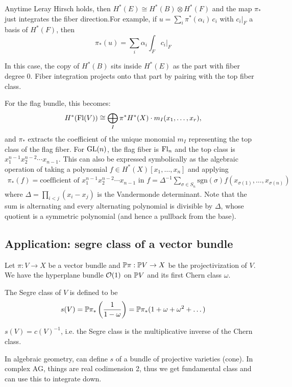 \documentclass[12pt]{article}
\begin{document}
\begin{remark}
    Anytime Leray Hirsch holds, then $H^*(E)\cong H^*(B)\otimes H^*(F)$ and the map $\pi_*$ just integrates the fiber direction.For example, if
$u=\sum_i \pi^*(\alpha_i)\,c_i$
with $c_i|_F$ a basis of $H^*(F)$, then
\[\pi_*(u)=\sum_i \alpha_i \int_F c_i|_F\]



In this case, the copy of $H^*(B)$ sits inside $H^*(E)$ as the part with fiber degree 0. Fiber integration projects onto that part by pairing with the top fiber class.

For the flag bundle, this becomes:
\[
H^*(\Fl(V))\cong \bigoplus_I \pi^*H^*(X)\cdot m_I(x_1,\dots,x_r),
\]
and $\pi_*$ extracts the coefficient of the unique monomial $m_I$ representing the top class of the flag fiber. For $\GL(n)$, the flag fiber is $\Fl_n$ and the top class is $x_1^{n-1}x_2^{n-2}\cdots x_{n-1}$. This can also be expressed symbolically as the algebraic operation of taking a polynomial $f \in H^*(X)[x_1,\dots,x_n]$ and applying \begin{align*}
    \pi_*(f) = \text{coefficient of } x_1^{n-1}x_2^{n-2}\cdots x_{n-1} \text{ in } f = \Delta^{-1} \sum_{\sigma \in S_n} \mathrm{sgn}(\sigma) f(x_{\sigma(1)},\dots, x_{\sigma(n)})
\end{align*}
where $\Delta = \prod_{i<j} (x_i - x_j)$ is the Vandermonde determinant. Note that the sum is alternating and every alternating polynomial is divisible by $\Delta$, whose quotient is a symmetric polynomial (and hence a pullback from the base). 
\end{remark}
\subsection{Application: segre class of a vector bundle}
Let $\pi: V \to X$ be a vector bundle and $\P\pi: \P V \to X$ be the projectivization of $V$. We have the hyperplane bundle $\cO(1)$ on $\P V$ and its first Chern class $\omega$. \begin{definition}
    The Segre class of $V$ is defined to be \begin{align*}
    s(V) = \P\pi_* \left( \frac{1}{1-\omega} \right) = \P\pi_* (1 + \omega + \omega^2 + \dots)
\end{align*}
\end{definition}
\begin{theorem}
    $s(V) = c(V)^{-1}$, i.e. the Segre class is the multiplicative inverse of the Chern class.
\end{theorem}
\begin{remark}
    In algebraic geometry, can define $s$ of a bundle of projective varieties (cone). In complex AG, things are real codimension 2, thus we get fundamental class and can use this to integrate down. 
\end{remark}
\end{document}
